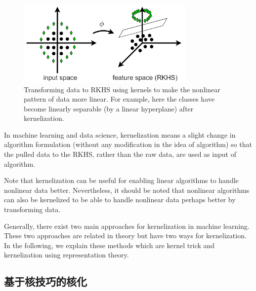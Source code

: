 \documentclass[lang=cn,10pt]{gorgeousnbook}
\numberwithin{equation}{section}%
\numberwithin{figure}{section}%
\begin{document}
\begin{figure}[!t]
\centering
\includegraphics[width=3.4in]{./images/separating_classes}
\caption{Transforming data to RKHS using kernels to make the nonlinear pattern of data more linear. For example, here the classes have become linearly separable (by a linear hyperplane) after kernelization.}
\label{figure_separating_classes_kernel}
\end{figure}

\begin{definition}[Kernelization]
In machine learning and data science, kernelization means a slight change in algorithm formulation (without any modification in the idea of algorithm) so that the pulled data to the RKHS, rather than the raw data, are used as input of algorithm. 
\end{definition}
Note that kernelization can be useful for enabling linear algorithms to handle nonlinear data better. Nevertheless, it should be noted that nonlinear algorithms can also be kernelized to be able to handle nonlinear data perhaps better by transforming data. 

Generally, there exist two main approaches for kernelization in machine learning. These two approaches are related in theory but have two ways for kernelization. 
In the following, we explain these methods which are kernel trick and kernelization using representation theory. 

\subsection{基于核技巧的核化}\label{section_kernel_trick}
\end{document}

